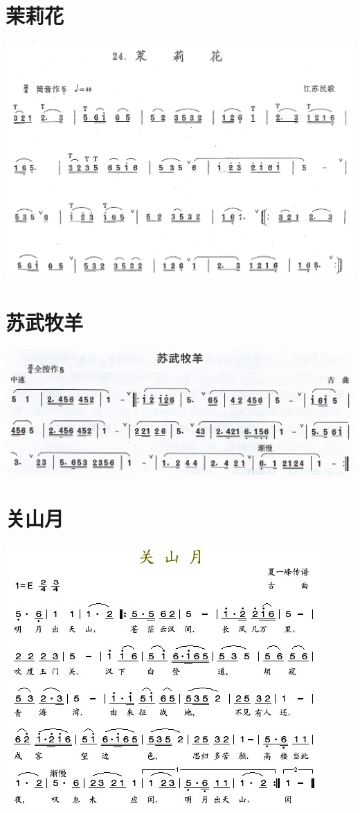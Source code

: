 \documentclass[cn,pad,twocol]{elegantbook}
\begin{document}
\section{茉莉花}    \includegraphics[width=\textwidth]{dongxiao/20200711-茉莉花.jpg}
\section{苏武牧羊}  \includegraphics[width=\textwidth]{dongxiao/20200711-苏武牧羊.jpeg}
\section{关山月}    \includegraphics[width=\textwidth]{dongxiao/20200411-清平乐-关山月.jpg}
\end{document}
